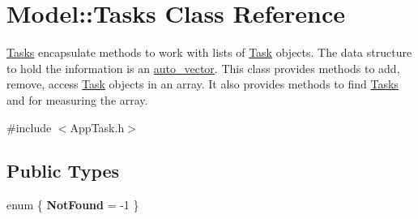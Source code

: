 \hypertarget{class_model_1_1_tasks}{\section{Model\-:\-:Tasks Class Reference}
\label{class_model_1_1_tasks}
}


\hyperlink{class_model_1_1_tasks}{Tasks} encapsulate methods to work with lists of \hyperlink{class_model_1_1_task}{Task} objects. The data structure to hold the information is an \hyperlink{classauto__vector}{auto\-\_\-vector}. This class provides methods to add, remove, access \hyperlink{class_model_1_1_task}{Task} objects in an array. It also provides methods to find \hyperlink{class_model_1_1_tasks}{Tasks} and for measuring the array.  




{\ttfamily \#include $<$App\-Task.\-h$>$}

\subsection*{Public Types}
\begin{DoxyCompactItemize}
\item 
enum \{ {\bfseries Not\-Found} = -\/1
 \}
\end{DoxyCompactItemize}
